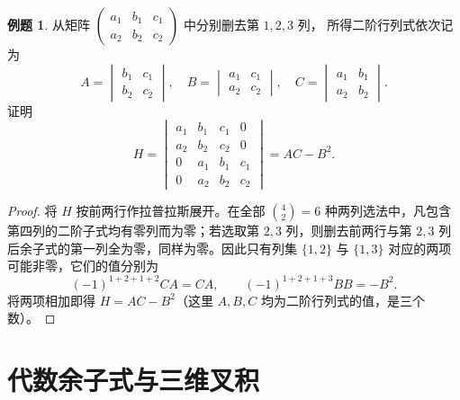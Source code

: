 \documentclass[UTF8, fontset=fandol, a4paper, 12pt]{ctexart}
\theoremstyle{definition}
\newtheorem{example}[theorem]{例题}
\begin{document}
\begin{example}
从矩阵 $\begin{pmatrix}a_1&b_1&c_1\\a_2&b_2&c_2\end{pmatrix}$ 中分别删去第 $1,2,3$ 列，
所得二阶行列式依次记为
\[
 A=\begin{vmatrix}b_1&c_1\\b_2&c_2\end{vmatrix},\quad
 B=\begin{vmatrix}a_1&c_1\\a_2&c_2\end{vmatrix},\quad
 C=\begin{vmatrix}a_1&b_1\\a_2&b_2\end{vmatrix}.
\]
证明
\[
 H=\begin{vmatrix}a_1&b_1&c_1&0\\a_2&b_2&c_2&0\\
 0&a_1&b_1&c_1\\0&a_2&b_2&c_2\end{vmatrix}=AC-B^2.
\]
\end{example}
\begin{proof}
将 $H$ 按前两行作拉普拉斯展开。在全部 $\binom42=6$ 种两列选法中，凡包含第四列的二阶子式均有零列而为零；若选取第 $2,3$ 列，则删去前两行与第 $2,3$ 列后余子式的第一列全为零，同样为零。因此只有列集 $\{1,2\}$ 与 $\{1,3\}$ 对应的两项可能非零，它们的值分别为
\[
 (-1)^{1+2+1+2}CA=CA,\qquad
 (-1)^{1+2+1+3}BB=-B^2.
\]
将两项相加即得 $H=AC-B^2$（这里 $A,B,C$ 均为二阶行列式的值，是三个数）。
\end{proof}

\section{代数余子式与三维叉积}
\end{document}

